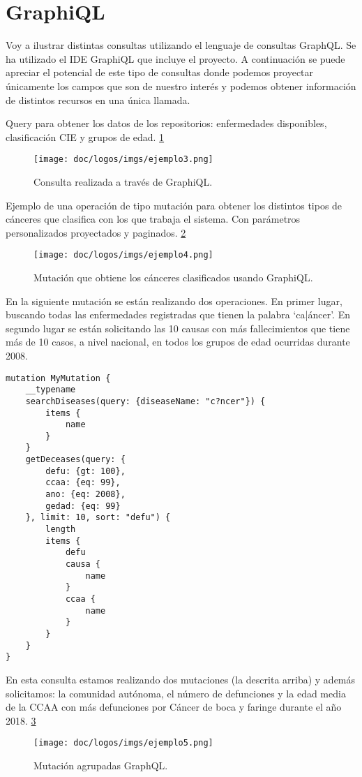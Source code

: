 \section{GraphiQL}
Voy a ilustrar distintas consultas utilizando el lenguaje de consultas GraphQL. Se ha 
utilizado el IDE GraphiQL que incluye el proyecto. A continuación se puede apreciar el 
potencial de este tipo de consultas donde podemos proyectar únicamente los campos que 
son de nuestro interés y podemos obtener información de distintos recursos en una única llamada.

\vskip 0.4in

Query para obtener los datos de los repositorios: enfermedades disponibles, clasificación CIE y grupos de edad. \ref{fig:4}
\FloatBarrier
\begin{figure}[h]
	\centering
	\texttt{[image: doc/logos/imgs/ejemplo3.png]}
	\caption{ Consulta realizada a través de GraphiQL. }
	\label{fig:4}
\end{figure}
\FloatBarrier

Ejemplo de una operación de tipo mutación para obtener los distintos tipos de cánceres que
clasifica con los que trabaja el sistema. Con parámetros personalizados proyectados y paginados. \ref{fig:5}
\FloatBarrier
\begin{figure}[h]
	\centering
	\texttt{[image: doc/logos/imgs/ejemplo4.png]}
	\caption{ Mutación que obtiene los cánceres clasificados usando GraphiQL. }
	\label{fig:5}
\end{figure}
\FloatBarrier


En la siguiente mutación se están realizando dos operaciones. En primer lugar, buscando
todas las enfermedades registradas que tienen la palabra `ca|áncer'. En segundo lugar se
están solicitando las 10 causas con más fallecimientos que tiene más de 10 casos, a nivel
nacional, en todos los grupos de edad ocurridas durante 2008.
\begin{lstlisting}[caption=Ejemplo de mutación usando el protocolo GraphQL] 
mutation MyMutation {
    __typename
    searchDiseases(query: {diseaseName: "c?ncer"}) {
        items {
            name
        }
    }
    getDeceases(query: {
        defu: {gt: 100}, 
        ccaa: {eq: 99}, 
        ano: {eq: 2008}, 
        gedad: {eq: 99}
    }, limit: 10, sort: "defu") {
        length
        items {
            defu
            causa {
                name
            }
            ccaa {
                name
            }
        }
    }
}
\end{lstlisting}


En esta consulta estamos realizando dos mutaciones (la descrita arriba) y además solicitamos: la comunidad autónoma,
el número de defunciones y la edad media de la CCAA con más defunciones por Cáncer de boca
y faringe durante el año 2018. \ref{fig:6}
\FloatBarrier
\begin{figure}[h]
	\centering
	\texttt{[image: doc/logos/imgs/ejemplo5.png]}
	\caption{ Mutación agrupadas GraphQL. }
		\label{fig:6}
\end{figure}
\FloatBarrier
